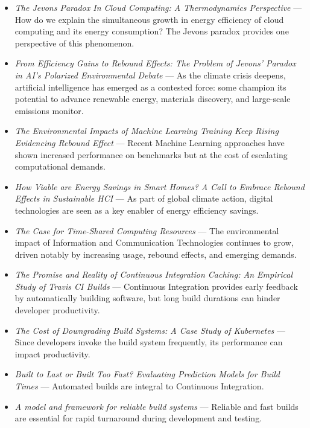 \documentclass[11pt,a4paper]{article}
\providecommand{\textcite}[1]{\cite{#1}}
\begin{document}
\begin{itemize}[leftmargin=1.3em,itemsep=2pt]
\item \textcite{arxiv2411_11540} \emph{The Jevons Paradox In Cloud Computing: A Thermodynamics Perspective} --- How do we explain the simultaneous growth in energy efficiency of cloud computing and its energy consumption? The Jevons paradox provides one perspective of this phenomenon.
\item \textcite{arxiv2501_16548} \emph{From Efficiency Gains to Rebound Effects: The Problem of Jevons' Paradox in AI's Polarized Environmental Debate} --- As the climate crisis deepens, artificial intelligence has emerged as a contested force: some champion its potential to advance renewable energy, materials discovery, and large-scale emissions monitor.
\item \textcite{arxiv2510_09022} \emph{The Environmental Impacts of Machine Learning Training Keep Rising Evidencing Rebound Effect} --- Recent Machine Learning approaches have shown increased performance on benchmarks but at the cost of escalating computational demands.
\item \textcite{arxiv2506_14653} \emph{How Viable are Energy Savings in Smart Homes? A Call to Embrace Rebound Effects in Sustainable HCI} --- As part of global climate action, digital technologies are seen as a key enabler of energy efficiency savings.
\item \textcite{arxiv2507_19287} \emph{The Case for Time-Shared Computing Resources} --- The environmental impact of Information and Communication Technologies continues to grow, driven notably by increasing usage, rebound effects, and emerging demands.
\item \textcite{arxiv2601_19146} \emph{The Promise and Reality of Continuous Integration Caching: An Empirical Study of Travis CI Builds} --- Continuous Integration provides early feedback by automatically building software, but long build durations can hinder developer productivity.
\item \textcite{arxiv2510_20041} \emph{The Cost of Downgrading Build Systems: A Case Study of Kubernetes} --- Since developers invoke the build system frequently, its performance can impact productivity.
\item \textcite{arxiv1712_06796} \emph{Built to Last or Built Too Fast? Evaluating Prediction Models for Build Times} --- Automated builds are integral to Continuous Integration.
\item \textcite{arxiv1203_2704} \emph{A model and framework for reliable build systems} --- Reliable and fast builds are essential for rapid turnaround during development and testing.

\end{itemize}
\end{document}
